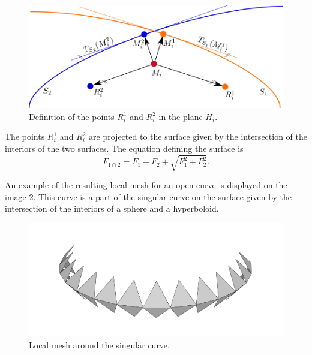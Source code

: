 \begin{figure}
    \centerline{\includegraphics[scale=0.5]{images/img39}}
    \caption[Definition of the points]
    {Definition of the points $R_i^1$ and $R_i^2$ in the plane $H_i$.}
    \label{img:39}
\end{figure}

The points $R_i^1$ and $R_i^2$ are projected to the surface given by the intersection
of the interiors of the two surfaces. The equation defining the surface is 
$$F_{1 \cap 2} = F_1 + F_2 + \sqrt{F_1^2+F_2^2}.$$

An example of the resulting local mesh for an open curve is displayed on the image
\ref{img:local-mesh-sing-curve}. This curve is a part of the singular curve on the surface 
given by the intersection of the interiors of a sphere and a hyperboloid.

\begin{figure}
    \centerline{\includegraphics[scale=0.3]{images/local-mesh-sing-curve}}
    \caption[Local mesh around the singular curve]
    {Local mesh around the singular curve.}
    \label{img:local-mesh-sing-curve}
\end{figure}
